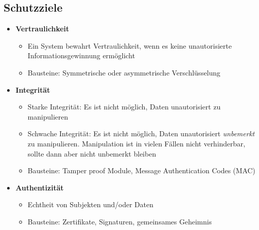 \subsection{Schutzziele}
\begin{itemize}
	\item \textbf{Vertraulichkeit}
	\begin{itemize}
		\item Ein System bewahrt Vertraulichkeit, wenn es keine unautorisierte Informationsgewinnung ermöglicht
		\item Bausteine: Symmetrische oder asymmetrische Verschlüsselung
	\end{itemize}
	\item \textbf{Integrität}
	\begin{itemize}
		\item Starke Integrität: Es ist nicht möglich, Daten unautorisiert zu manipulieren
		\item Schwache Integrität: Es ist nicht möglich, Daten unautorisiert \textit{unbemerkt} zu manipulieren. Manipulation ist in vielen Fällen nicht verhinderbar, sollte dann aber nicht unbemerkt bleiben
		\item Bausteine: Tamper proof Module, Message Authentication Codes (MAC)
	\end{itemize}
	\item \textbf{Authentizität}
	\begin{itemize}
		\item Echtheit von Subjekten und/oder Daten
		\item Bausteine: Zertifikate, Signaturen, gemeinsames Geheimnis
	\end{itemize}
\end{itemize}


